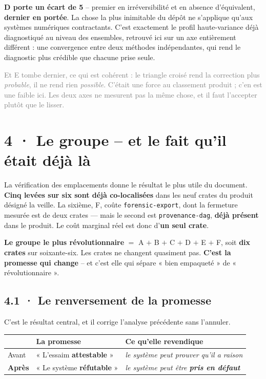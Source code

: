\documentclass[10pt]{article}
\newcommand{\sz}[1]{\textcolor{grey}{\small\textsf{#1}}}
\newcommand{\code}[1]{\texttt{\small #1}}
\begin{document}
\textbf{D porte un écart de 5} -- premier en irréversibilité et en absence d'équivalent,
\textbf{dernier en portée}. La chose la plus inimitable du dépôt ne s'applique qu'aux systèmes
numériques contractants. C'est exactement le profil haute-variance déjà diagnostiqué au niveau des
ensembles, retrouvé ici sur un axe entièrement différent : une convergence entre deux méthodes
indépendantes, qui rend le diagnostic plus crédible que chacune prise seule.

\sz{Et E tombe dernier, ce qui est cohérent : le triangle croisé rend la correction plus \emph{probable},
il ne rend rien \emph{possible}. C'était une force au classement produit ; c'en est une faible ici. Les
deux axes ne mesurent pas la même chose, et il faut l'accepter plutôt que le lisser.}

\section{4 · Le groupe -- et le fait qu'il était déjà là}

La vérification des emplacements donne le résultat le plus utile du document.
\textbf{Cinq levées sur six sont déjà co-localisées} dans les neuf crates du produit désigné la veille.
La sixième, F, coûte \code{forensic-export}, dont la fermeture mesurée est de deux crates --- mais
le second est \code{provenance-dag}, \textbf{déjà présent} dans le produit. Le coût marginal réel est
donc d'\textbf{un seul crate}.

\begin{acquis}
\textbf{Le groupe le plus révolutionnaire} $=$ A $+$ B $+$ C $+$ D $+$ E $+$ F, soit
\textbf{dix crates} sur soixante-six. Les crates ne changent quasiment pas.
\textbf{C'est la promesse qui change} -- et c'est elle qui sépare « bien empaqueté » de
« révolutionnaire ».
\end{acquis}

\subsection{4.1 · Le renversement de la promesse}

C'est le résultat central, et il corrige l'analyse précédente sans l'annuler.

\renewcommand{\arraystretch}{1.2}
\begin{center}\small
\begin{tabular}{@{}l >{\raggedright\arraybackslash}p{5.0cm} >{\raggedright\arraybackslash}p{8.0cm}@{}}
\toprule
& \textbf{La promesse} & \textbf{Ce qu'elle revendique} \\
\midrule
Avant & « L'essaim \textbf{attestable} » & \emph{le système peut prouver qu'il a raison} \\
\textbf{Après} & « Le système \textbf{réfutable} » & \emph{le système peut être \textbf{pris en défaut}} \\
\bottomrule
\end{tabular}
\end{center}
\end{document}
